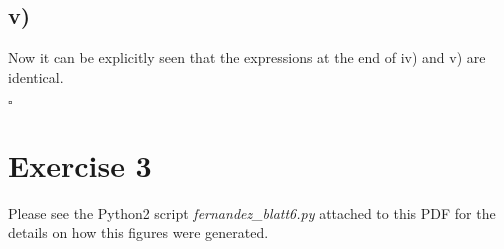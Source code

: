 \documentclass[11pt]{scrartcl} %
\begin{document}
         \subsection*{v)}
         Now it can be explicitly seen that the expressions at the end of iv) and v) are identical.
         \begin{flushright}
           $\square$\\
         \end{flushright}









         \vspace{5mm}
\section*{Exercise 3}
Please see the  Python2 script {\it fernandez\_blatt6.py} attached to this PDF for the details on how this figures were generated.
\end{document}
